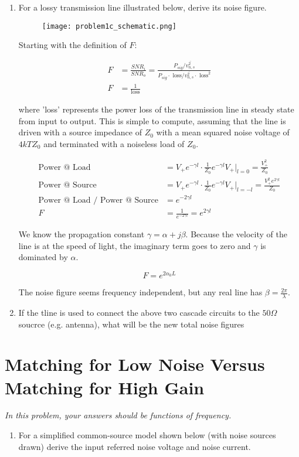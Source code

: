 \begin{enumerate}[label=(\alph*)]
    \item {\color{blue} For a lossy transmission line illustrated below, derive its noise figure.}

    \begin{figure}[H]
        \centering \texttt{[image: problem1c\_schematic.png]}
    \end{figure}

    Starting with the definition of $F$:

    \begin{align*}
        F &= \frac{SNR_i}{SNR_o} = \frac{P_{sig}/\overline{v_{n,s}^2}}{P_{sig} \cdot \text{ loss} / \overline{v_{n,s}^2} \cdot \text{ loss}^2} \\
        F &= \frac{1}{\text{loss}}
    \end{align*}

    where 'loss' represents the power loss of the transmission line in steady state from input to output. This is simple to compute, assuming that the line is driven with a source impedance of $Z_0$ with a mean squared noise voltage of $4 kT Z_0$ and terminated with a noiseless load of $Z_0$.

    \begin{align*}
        \text{Power @ Load} &= V_+ e^{-\gamma l} \cdot \frac{1}{Z_0} e^{-\gamma l} V_+ \rvert_{l=0} = \frac{V_+^2}{Z_0} \\
        \text{Power @ Source} &= V_+ e^{-\gamma l} \cdot \frac{1}{Z_0} e^{-\gamma l} V_+ \rvert_{l=-l} = \frac{V_+^2 e^{2 \gamma l}}{Z_0} \\
        \text{Power @ Load / Power @ Source} &= e^{-2 \gamma l} \\
        F &= \frac{1}{e^{-2 \gamma l}} = e^{2 \gamma l}
    \end{align*}

    We know the propagation constant $\gamma = \alpha + j \beta$. Because the velocity of the line is at the speed of light, the imaginary term goes to zero and $\gamma$ is dominated by $\alpha$.

    $$ F = e^{2 \alpha_0 L} $$

    The noise figure seems frequency independent, but any real line has $\beta = \frac{2\pi}{\lambda}$.

    \item {\color{blue} If the tline is used to connect the above two cascade circuits to the $50\Omega$ soucrce (e.g. antenna), what will be the new total noise figures}
\end{enumerate}

\section{Matching for Low Noise Versus Matching for High Gain}
\emph{In this problem, your answers should be functions of frequency.}

\begin{enumerate}[label=(\alph*)]
    \item {\color{blue} For a simplified common-source model shown below (with noise sources drawn) derive the input referred noise voltage and noise current.}
\end{enumerate}

